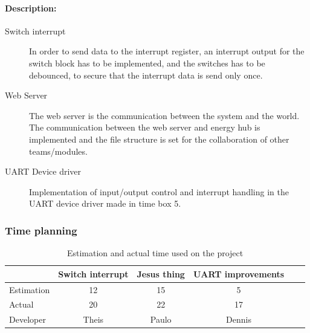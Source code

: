 \paragraph{Description:}
\begin{description}
	\item[Switch interrupt] In order to send data to the interrupt register, an interrupt output for the switch block has to be implemented, and the switches has to be debounced, to secure that the interrupt data is send only once.
	\item[Web Server] The web server is the communication between the system and the world. The communication between the web server and energy hub is implemented and the file structure is set for the collaboration of other teams/modules.
	\item[UART Device driver] Implementation of input/output control and interrupt handling in the UART device driver made in time box 5.
\end{description}

\subsubsection{Time planning}

\begin{table}[H]
\centering
	\begin{tabular}{|l|c|c|c|c|c|}
		\hline
		~			& Switch interrupt		& Jesus thing		& UART improvements	\\ \hline
		Estimation	& 12					& 15				& 5					\\
		Actual		& 20					& 22				& 17				\\
		Developer	& Theis					& Paulo			& Dennis				\\
		\hline
	\end{tabular}
	\caption{Estimation and actual time used on the project}
\end{table}

